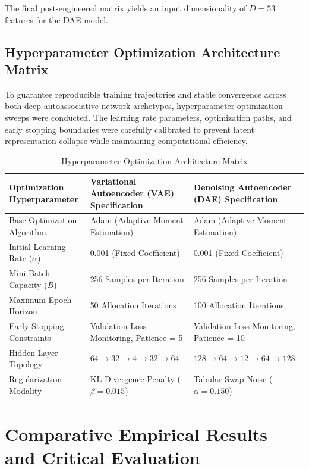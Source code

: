 \documentclass[11pt,a4paper]{report}
\begin{document}
The final post-engineered matrix yields an input dimensionality of $D=53$ features for the DAE model.

\subsection{Hyperparameter Optimization Architecture Matrix}
To guarantee reproducible training trajectories and stable convergence across both deep autoassociative network archetypes, hyperparameter optimization sweeps were conducted. The learning rate parameters, optimization paths, and early stopping boundaries were carefully calibrated to prevent latent representation collapse while maintaining computational efficiency.

\begin{table}[htbp]
\centering
\caption{Hyperparameter Optimization Architecture Matrix}
\begin{tabular}{@{}p{4cm} p{4cm} p{4cm}@{}}
\toprule
\textbf{Optimization Hyperparameter} & \textbf{Variational Autoencoder (VAE) Specification} & \textbf{Denoising Autoencoder (DAE) Specification} \\
\midrule
Base Optimization Algorithm & Adam (Adaptive Moment Estimation) & Adam (Adaptive Moment Estimation) \\
Initial Learning Rate ($\alpha$) & 0.001 (Fixed Coefficient) & 0.001 (Fixed Coefficient) \\
Mini-Batch Capacity ($B$) & 256 Samples per Iteration & 256 Samples per Iteration \\
Maximum Epoch Horizon & 50 Allocation Iterations & 100 Allocation Iterations \\
Early Stopping Constraints & Validation Loss Monitoring, Patience = 5 & Validation Loss Monitoring, Patience = 10 \\
Hidden Layer Topology & $64 \rightarrow 32 \rightarrow 4 \rightarrow 32 \rightarrow 64$ & $128 \rightarrow 64 \rightarrow 12 \rightarrow 64 \rightarrow 128$ \\
Regularization Modality & KL Divergence Penalty ($\beta = 0.015$) & Tabular Swap Noise ($\alpha = 0.150$) \\
\bottomrule
\end{tabular}
\label{tab:hyperparam_matrix}
\end{table}

\section{Comparative Empirical Results and Critical Evaluation}
\end{document}
